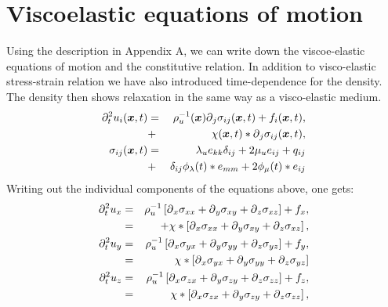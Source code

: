 \documentclass[11pt]{article}
\begin{document}
\section*{Viscoelastic equations of motion} 
Using the description in Appendix A, we can write down the viscoe-elastic equations
of motion and the constitutive relation.
In addition to visco-elastic stress-strain relation we have also
introduced time-dependence for the density.
The density then shows relaxation in the same way as a visco-elastic medium.
\begin{eqnarray*}
  \partial^2_t{u_i(\mbox{\boldmath $x$}, t)} & = & \rho^{-1}_u(\mbox{\boldmath $x$})\mbox{$\partial$}_j \sigma_{ij}(\mbox{\boldmath $x$}, t) 
                                               +f_i(\mbox{\boldmath $x$},t),\\
                    & + & \chi(\mbox{\boldmath $x$},t)*\mbox{$\partial$}_j \sigma_{ij}(\mbox{\boldmath $x$}, t), \\
					   \label{eq:iso-ve-eqm}
  \sigma_{ij}(\mbox{\boldmath $x$}, t) & = & 
                            \lambda_u e_{kk}\delta_{ij} + 2\mu_u e_{ij} 
                                               +q_{ij} \nonumber\\
                      & + & \delta_{ij}\phi_{\lambda}(t)*e_{mm} 
                                         +2\phi_{\mu}(t)*e_{ij}
					  \label{eq:iso-ve-cse}
\end{eqnarray*}
Writing out the individual components of the equations above, one gets:
%
\begin{eqnarray*}
  \partial^2_t{u}_x & = & \rho^{-1}_u\left[\mbox{$\partial$}_x \sigma_{xx} +\mbox{$\partial$}_y \sigma_{xy} 
                                           +\mbox{$\partial$}_z \sigma_{xz}\right] + f_x, \\
            & = & + \chi*\left[\mbox{$\partial$}_x \sigma_{xx} +\mbox{$\partial$}_y \sigma_{xy} 
                                           +\mbox{$\partial$}_z \sigma_{xz}\right], \\
  \partial^2_t{u}_y & = & \rho^{-1}_u\left[\mbox{$\partial$}_x \sigma_{yx} +\mbox{$\partial$}_y \sigma_{yy} 
                                           +\mbox{$\partial$}_z \sigma_{yz}\right] + f_y, \\
            & = & \chi*\left[\mbox{$\partial$}_x \sigma_{yx} +\mbox{$\partial$}_y \sigma_{yy} 
                                           +\mbox{$\partial$}_z \sigma_{yz}\right] \\
  \partial^2_t{u}_z & = & \rho^{-1}_u\left[\mbox{$\partial$}_x \sigma_{zx} +\mbox{$\partial$}_y \sigma_{zy} 
                                           +\mbox{$\partial$}_z \sigma_{zz}\right] + f_z, \\
            & = & \chi*\left[\mbox{$\partial$}_x \sigma_{zx} +\mbox{$\partial$}_y \sigma_{zy} 
                                           +\mbox{$\partial$}_z \sigma_{zz}\right],
\end{eqnarray*}
\end{document}
